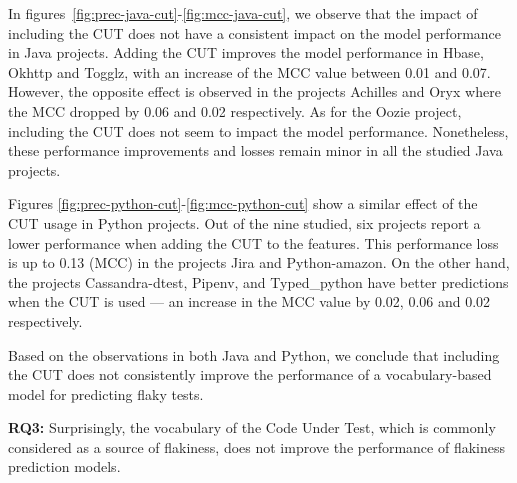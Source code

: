 In figures~\ref{fig:prec-java-cut}-\ref{fig:mcc-java-cut}, we observe that the impact of including the CUT does not have a consistent impact on the model performance in Java projects.
Adding the CUT improves the model performance in Hbase, Okhttp and Togglz, with an increase of the MCC value between 0.01 and 0.07.
However, the opposite effect is observed in the projects Achilles and Oryx where the MCC dropped by 0.06 and 0.02 respectively.
As for the Oozie project, including the CUT does not seem to impact the model performance.
Nonetheless, these performance improvements and losses remain minor in all the studied Java projects.

Figures \ref{fig:prec-python-cut}-\ref{fig:mcc-python-cut} show a similar effect of the CUT usage in Python projects.
Out of the nine studied, six projects report a lower performance when adding the CUT to the features.
This performance loss is up to 0.13 (MCC) in the projects Jira and Python-amazon.
On the other hand, the projects Cassandra-dtest, Pipenv, and Typed\_python have better predictions when the CUT is used --- an increase in the MCC value by 0.02, 0.06 and 0.02 respectively.

Based on the observations in both Java and Python, we conclude that including the CUT does not consistently improve the performance of a vocabulary-based model for predicting flaky tests.

\begin{tcolorbox}[
    left=2pt,right=2pt,top=2pt,bottom=2pt,
    arc=0pt,
    boxrule=1.2pt
]
\textbf{RQ3:} Surprisingly, the vocabulary of the Code Under Test, which is commonly considered as a source of flakiness, does not improve the performance of flakiness prediction models. 
\end{tcolorbox}
